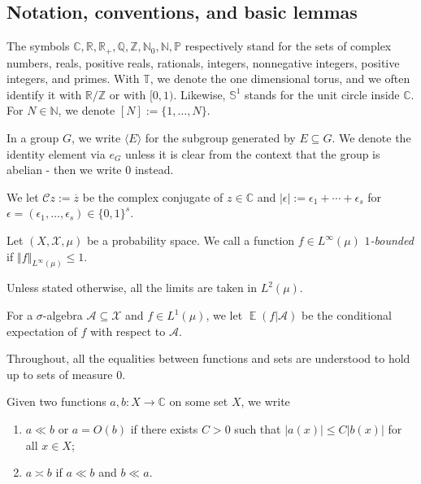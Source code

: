 \documentclass[11pt]{amsart}
\theoremstyle{definition}
\DeclareMathOperator*{\E}{\mathbb{E}}
\newcommand{\C}{{\mathbb C}}
\newcommand{\F}{{\mathbb F}}
\newcommand{\N}{{\mathbb N}}
\renewcommand{\P}{{\mathbb P}}
\newcommand{\Q}{{\mathbb Q}}
\newcommand{\R}{{\mathbb R}}
\renewcommand{\S}{\mathbb{S}}
\newcommand{\T}{{\mathbb T}}
\newcommand{\Z}{{\mathbb Z}}
\newcommand{\CA}{{\mathcal A}}
\newcommand{\CC}{{\mathcal C}}
\newcommand{\CX}{{\mathcal X}}
\newcommand{\eps}{\epsilon}
\newcommand{\norm}[1]{\left\Vert #1\right\Vert}
\newcommand{\1}{{\mathbf{1}}}
\begin{document}
\subsection{Notation, conventions, and basic lemmas}\label{SS: Notation}
The symbols $\C, \R, \R_+, \Q, \Z, \N_0, \N, \P$ respectively stand for the sets of complex numbers, reals, positive reals, rationals, integers, nonnegative integers, positive integers, and primes. With $\T$, we denote the one dimensional torus, and we often identify it with $\R/\Z$ or  with $[0,1)$. Likewise, $\S^1$ stands for the unit circle inside $\C$. %
For $N\in\N$, we denote $[N]:=\{1, \ldots, N\}$. %



{In a group $G$, we write $\langle E \rangle$ for the subgroup generated by $E\subseteq G$. We denote the identity element via $e_G$  unless it is clear from the context that the group is abelian - then we write 0 instead.}

We let $\CC z := \overline{z}$ be the complex conjugate of $z\in \C$ and $|\eps|:=\eps_1 + \cdots + \eps_s$ for $\eps=(\eps_1, \ldots, \eps_s)\in\{0,1\}^s.$

Let $(X, \CX, \mu)$ be a probability space. We call a function $f\in L^\infty(\mu)$ \emph{$1$-bounded} if $\norm{f}_{L^\infty(\mu)}\leq 1$.

Unless stated otherwise, all the limits are taken in $L^2(\mu)$.


For a $\sigma$-algebra $\CA\subseteq\CX$ and $f\in L^1(\mu)$, we let $\E(f|\CA)$ be the conditional expectation of $f$ with respect to $\CA$. 

Throughout, all the equalities between functions and sets are understood to hold up to sets of measure 0. 


Given two functions $a,b: X\to\C$ on some set $X$, we write
\begin{enumerate}
    \item $a\ll b$ or $a = O(b)$ if there exists $C>0$ %
    such that $|a(x)| \leq C |b(x)|$ for all $x\in X$; 
    \item $a \asymp b$ if $a\ll b$ and $b\ll a$.
\end{enumerate}
\end{document}
